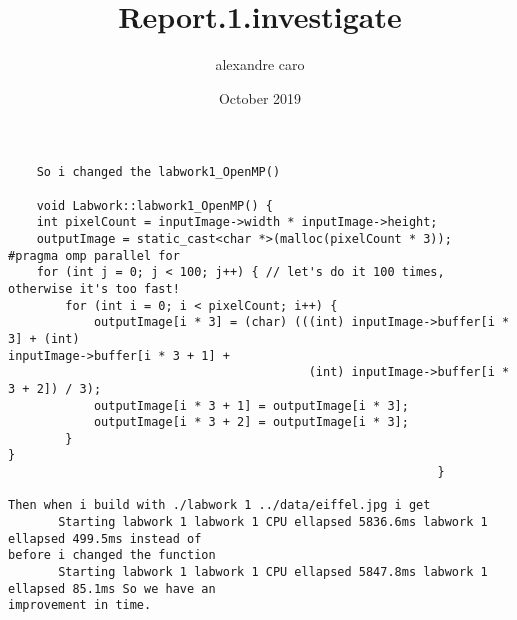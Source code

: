 \documentclass{article} \usepackage[utf8]{inputenc} \title{Report.1.investigate}
\author{alexandre caro } \date{October 2019}
\begin{document}
 \maketitle \begin{verbatim}
    So i changed the labwork1_OpenMP()
    
    void Labwork::labwork1_OpenMP() {
    int pixelCount = inputImage->width * inputImage->height;
    outputImage = static_cast<char *>(malloc(pixelCount * 3));
#pragma omp parallel for
    for (int j = 0; j < 100; j++) { // let's do it 100 times, otherwise it's too fast!
        for (int i = 0; i < pixelCount; i++) {
            outputImage[i * 3] = (char) (((int) inputImage->buffer[i * 3] + (int) 
inputImage->buffer[i * 3 + 1] +
                                          (int) inputImage->buffer[i * 3 + 2]) / 3);
            outputImage[i * 3 + 1] = outputImage[i * 3];
            outputImage[i * 3 + 2] = outputImage[i * 3];
        }                                                                                                                   }
                                                            }
                                                            
Then when i build with ./labwork 1 ../data/eiffel.jpg i get
       Starting labwork 1 labwork 1 CPU ellapsed 5836.6ms labwork 1 ellapsed 499.5ms instead of 
before i changed the function
       Starting labwork 1 labwork 1 CPU ellapsed 5847.8ms labwork 1 ellapsed 85.1ms So we have an 
improvement in time. \end{verbatim} 
\end{document}
